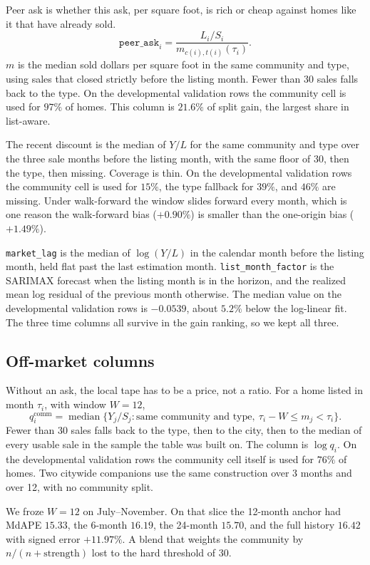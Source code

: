 \documentclass[11pt]{article}
\newcommand{\la}{list-aware}
\begin{document}
Peer ask is whether this ask, per square foot, is rich or cheap against homes like it that have already sold.
\[
\texttt{peer\_ask}_i = \frac{L_i/S_i}{m_{c(i),t(i)}(\tau_i)}.
\]
\(m\) is the median sold dollars per square foot in the same community and type, using sales that closed strictly before the listing month. Fewer than 30 sales falls back to the type. On the developmental validation rows the community cell is used for \(97\%\) of homes. This column is \(21.6\%\) of split gain, the largest share in \la.

The recent discount is the median of \(Y/L\) for the same community and type over the three sale months before the listing month, with the same floor of 30, then the type, then missing. Coverage is thin. On the developmental validation rows the community cell is used for \(15\%\), the type fallback for \(39\%\), and \(46\%\) are missing. Under walk-forward the window slides forward every month, which is one reason the walk-forward bias (\(+0.90\%\)) is smaller than the one-origin bias (\(+1.49\%\)).

\texttt{market\_lag} is the median of \(\log(Y/L)\) in the calendar month before the listing month, held flat past the last estimation month. \texttt{list\_month\_factor} is the SARIMAX forecast when the listing month is in the horizon, and the realized mean log residual of the previous month otherwise. The median value on the developmental validation rows is \(-0.0539\), about \(5.2\%\) below the log-linear fit. The three time columns all survive in the gain ranking, so we kept all three.

\subsection{Off-market columns}

Without an ask, the local tape has to be a price, not a ratio. For a home listed in month \(\tau_i\), with window \(W=12\),
\[
q^{\mathrm{comm}}_i = \operatorname{median}\{Y_j/S_j : \text{same community and type},\ \tau_i-W \le m_j < \tau_i\}.
\]
Fewer than 30 sales falls back to the type, then to the city, then to the median of every usable sale in the sample the table was built on. The column is \(\log q_i\). On the developmental validation rows the community cell itself is used for \(76\%\) of homes. Two citywide companions use the same construction over 3 months and over 12, with no community split.

We froze \(W=12\) on July--November. On that slice the 12-month anchor had MdAPE \(15.33\), the 6-month \(16.19\), the 24-month \(15.70\), and the full history \(16.42\) with signed error \(+11.97\%\). A blend that weights the community by \(n/(n+\text{strength})\) lost to the hard threshold of 30.
\end{document}
